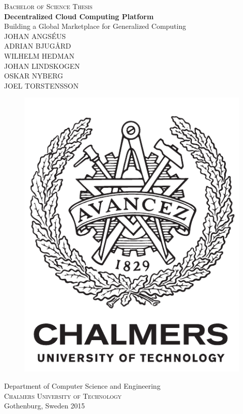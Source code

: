 \newpage
\restoregeometry
\thispagestyle{empty}
\mbox{}


\newpage
\thispagestyle{empty}
\begin{center}
	\textsc{\large Bachelor of Science Thesis}\\[4cm]
	\textbf{\large Decentralized Cloud Computing Platform} \\[1cm]
	{\large Building a Global Marketplace for Generalized Computing}\\[1cm]
	{\large JOHAN ANGSÉUS\\
	        ADRIAN BJUGÅRD\\
	        WILHELM HEDMAN\\
	        JOHAN LINDSKOGEN\\
	        OSKAR NYBERG\\
	        JOEL TORSTENSSON\\}
	
	\vfill	
	\begin{figure}[h!]
	\centering
	\includegraphics[width=0.2\pdfpagewidth]{figure/auxiliary/logo_eng.pdf} \\	
	\end{figure}	\vspace{5mm}	
	
	Department of Computer Science and Engineering \\
	\textsc{Chalmers University of Technology} \\
	Gothenburg, Sweden 2015 \\
\end{center}


